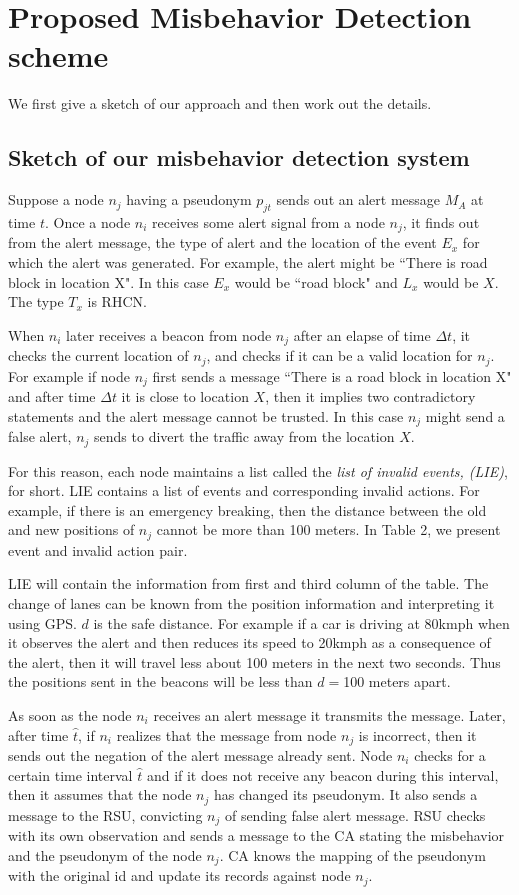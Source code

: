 \documentclass[conference]{IEEEtran}[10pt]
\begin{document}
\section{Proposed Misbehavior Detection scheme}
\label{sec:MDS}
We first give a sketch of our approach and then work out the details. 

\subsection{Sketch of our misbehavior detection system}
Suppose a node $n_j$ having a pseudonym $p_{jt}$ sends out an alert message $M_A$ at time $t$. 
Once a node $n_i$ receives some alert signal from a node $n_j$, it finds out from the alert message,  
the type of alert and the location of the event $E_x$ for which the alert was generated. 
For example, the alert might be ``There is road block in location X". 
In this case $E_x$ would be ``road block" and $L_x$ would be $X$. 
The type $T_x$ is RHCN. 

When $n_i$ later receives a beacon from node $n_j$ after an elapse of time $\Delta t$, it checks the current location of $n_j$, 
and checks if it can be a valid location for $n_j$. 
For example if node $n_j$ first sends a message ``There is a road block in location X" and after time $\Delta t$ it is close to location $X$, 
then it implies two contradictory statements and the alert message cannot be trusted. 
In this case  $n_j$ might send a false alert, $n_j$ sends to divert the traffic away from the location $X$. 

For this reason, each node maintains a list called the \emph{list of invalid events, (LIE)}, for short. 
LIE contains a list of events and corresponding invalid actions. 
For example, if there is an emergency breaking, then the distance between the old and new positions of $n_j$ cannot be more than 100 meters. 
In Table 2, we present event and invalid action pair. 

LIE will contain the information from first and third column of the table. 
The change of lanes can be known from the position information and interpreting it using GPS. 
$d$ is the safe distance.  For example if a car is driving at 80kmph when it observes the alert and 
then reduces its speed to 20kmph as a consequence of the alert, then it will travel less about 100 meters in the next two seconds. 
Thus the positions sent in the beacons will be less than $d=$100 meters apart. 

As soon as the node $n_i$ receives an alert message it transmits the message. 
Later, after time $\hat{t}$, if $n_i$ realizes that the message from node $n_j$ is incorrect, then it sends out the negation of the alert message 
already sent. 
Node $n_i$ checks for a certain time interval $\hat{t}$ and if it does not receive any beacon during this interval,
then it assumes that the node $n_j$ has changed its pseudonym. 
It also sends a message to the RSU, convicting $n_j$ of sending false alert message. 
RSU checks with its own observation and sends a message to the CA stating the misbehavior and the pseudonym of the node $n_j$. 
CA knows the mapping of the pseudonym with the original id and update its records against node $n_j$. 
\end{document}
